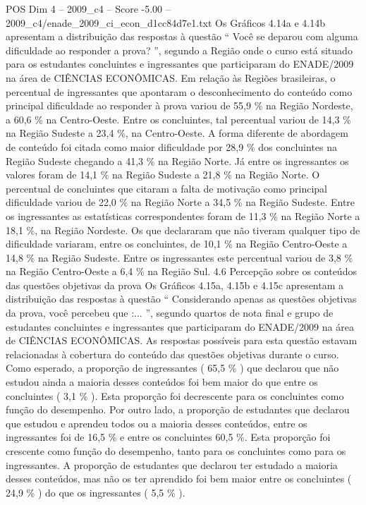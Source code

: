 \begin{textsample}{POS Dim 4 – 2009\_c4 – Score -5.00 – 2009\_c4/enade\_2009\_ci\_econ\_d1cc84d7e1.txt}
Os Gráficos 4.14a e 4.14b apresentam a distribuição das respostas à questão “ Você se deparou com alguma dificuldade ao responder a prova? ”, segundo a Região onde o curso está situado para os estudantes concluintes e ingressantes que participaram do ENADE/2009 na área de CIÊNCIAS ECONÔMICAS.
Em relação às Regiões brasileiras, o percentual de ingressantes que apontaram o desconhecimento do conteúdo como principal dificuldade ao responder à prova variou de 55,9 \% na Região Nordeste, a 60,6 \% na Centro-Oeste.
Entre os concluintes, tal percentual variou de 14,3 \% na Região Sudeste a 23,4 \%, na Centro-Oeste.
A forma diferente de abordagem de conteúdo foi citada como maior dificuldade por 28,9 \% dos concluintes na Região Sudeste chegando a 41,3 \% na Região Norte.
Já entre os ingressantes os valores foram de 14,1 \% na Região Sudeste a 21,8 \% na Região Norte.
O percentual de concluintes que citaram a falta de motivação como principal dificuldade variou de 22,0 \% na Região Norte a 34,5 \% na Região Sudeste.
Entre os ingressantes as estatísticas correspondentes foram de 11,3 \% na Região Norte a 18,1 \%, na Região Nordeste.
Os que declararam que não tiveram qualquer tipo de dificuldade variaram, entre os concluintes, de 10,1 \% na Região Centro-Oeste a 14,8 \% na Região Sudeste.
Entre os ingressantes este percentual variou de 3,8 \% na Região Centro-Oeste a 6,4 \% na Região Sul. 4.6 Percepção sobre os conteúdos das questões objetivas da prova Os Gráficos 4.15a, 4.15b e 4.15c apresentam a distribuição das respostas à questão “ Considerando apenas as questões objetivas da prova, você percebeu que :... ”, segundo quartos de nota final e grupo de estudantes concluintes e ingressantes que participaram do ENADE/2009 na área de CIÊNCIAS ECONÔMICAS.
As respostas possíveis para esta questão estavam relacionadas à cobertura do conteúdo das questões objetivas durante o curso.
Como esperado, a proporção de ingressantes ( 65,5 \% ) que declarou que não estudou ainda a maioria desses conteúdos foi bem maior do que entre os concluintes ( 3,1 \% ).
Esta proporção foi decrescente para os concluintes como função do desempenho.
Por outro lado, a proporção de estudantes que declarou que estudou e aprendeu todos ou a maioria desses conteúdos, entre os ingressantes foi de 16,5 \% e entre os concluintes 60,5 \%.
Esta proporção foi crescente como função do desempenho, tanto para os concluintes como para os ingressantes.
A proporção de estudantes que declarou ter estudado a maioria desses conteúdos, mas não os ter aprendido foi bem maior entre os concluintes ( 24,9 \% ) do que os ingressantes ( 5,5 \% ).

\end{textsample}
